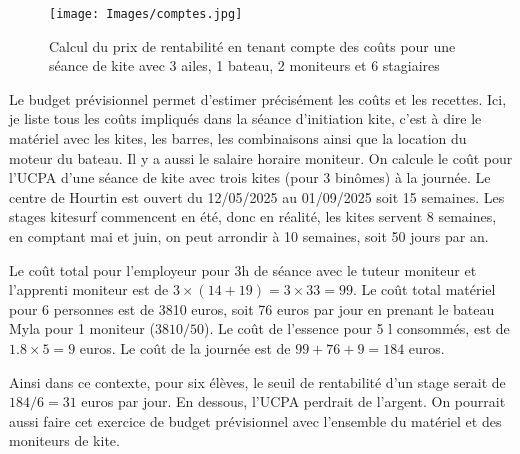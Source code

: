 \documentclass[11pt,a4paper]{report}
\begin{document}
\begin{figure}
\texttt{[image: Images/comptes.jpg]} 
\caption{Calcul du prix de rentabilité en tenant compte
des co\^uts  pour une séance de kite
avec 3 ailes, 1 bateau, 2 moniteurs et 6 stagiaires\label{couts}}
\end{figure}

Le budget prévisionnel permet d'estimer précisément les co\^uts et les recettes.
Ici, je liste tous les coûts impliqués dans la séance d’initiation kite, 
c'est  à dire le matériel avec les kites, les barres, les 
combinaisons ainsi que la location du moteur du bateau. 
Il y a aussi le salaire horaire moniteur. On calcule le coût pour l'UCPA
d'une séance de kite avec trois kites (pour 3 binômes) à la journée.
Le centre de Hourtin est ouvert du 12/05/2025 au 01/09/2025 soit 15 semaines. 
Les stages kitesurf commencent en été, donc en réalité, les kites servent
8 semaines, en comptant mai et juin, on peut arrondir à 10 semaines,
soit 50 jours par an.

Le coût total pour l'employeur pour 3h de séance avec le tuteur moniteur
et l'apprenti moniteur est de $3\times(14+19) = 3\times33 = 99 $.
Le coût total matériel pour 6 personnes est de 3810 euros, soit 76 euros
par jour  en prenant le bateau Myla pour 1 moniteur ($3810/50$).
Le coût de l'essence pour 5 l consommés, est de $1.8\times5 = 9$ euros.
Le coût de la journée est de $99 + 76 + 9 =  184 $ euros.

Ainsi dans ce contexte,  pour six élèves, le seuil de rentabilité
d'un stage serait de $184/6 = 31$ euros
par jour. En dessous, l'UCPA perdrait de l'argent.
On pourrait aussi faire cet exercice de budget prévisionnel avec
l'ensemble du matériel et des moniteurs de kite.

\end{document}
